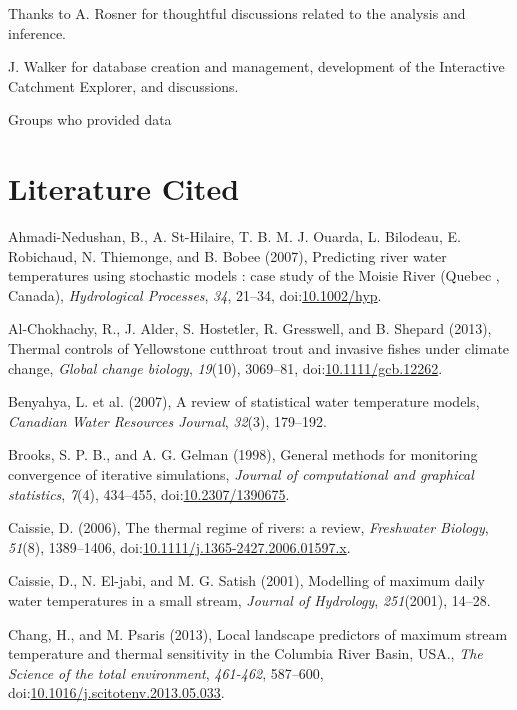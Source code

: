 Thanks to A. Rosner for thoughtful discussions related to the analysis
and inference.

J. Walker for database creation and management, development of the
Interactive Catchment Explorer, and discussions.

Groups who provided data

\section*{Literature Cited}\label{literature-cited}

\hypertarget{refs}{}
\hypertarget{ref-Ahmadi-Nedushan2007}{}
Ahmadi-Nedushan, B., A. St-Hilaire, T. B. M. J. Ouarda, L. Bilodeau, E.
Robichaud, N. Thiemonge, and B. Bobee (2007), Predicting river water
temperatures using stochastic models : case study of the Moisie River
(Quebec , Canada), \emph{Hydrological Processes}, \emph{34}, 21--34,
doi:\href{https://doi.org/10.1002/hyp}{10.1002/hyp}.

\hypertarget{ref-Al-Chokhachy2013a}{}
Al-Chokhachy, R., J. Alder, S. Hostetler, R. Gresswell, and B. Shepard
(2013), Thermal controls of Yellowstone cutthroat trout and invasive
fishes under climate change, \emph{Global change biology},
\emph{19}(10), 3069--81,
doi:\href{https://doi.org/10.1111/gcb.12262}{10.1111/gcb.12262}.

\hypertarget{ref-Benyahya2007}{}
Benyahya, L. et al. (2007), A review of statistical water temperature
models, \emph{Canadian Water Resources Journal}, \emph{32}(3), 179--192.

\hypertarget{ref-Brooks1998}{}
Brooks, S. P. B., and A. G. Gelman (1998), General methods for
monitoring convergence of iterative simulations, \emph{Journal of
computational and graphical statistics}, \emph{7}(4), 434--455,
doi:\href{https://doi.org/10.2307/1390675}{10.2307/1390675}.

\hypertarget{ref-Caissie2006}{}
Caissie, D. (2006), The thermal regime of rivers: a review,
\emph{Freshwater Biology}, \emph{51}(8), 1389--1406,
doi:\href{https://doi.org/10.1111/j.1365-2427.2006.01597.x}{10.1111/j.1365-2427.2006.01597.x}.

\hypertarget{ref-Caissie2001}{}
Caissie, D., N. El-jabi, and M. G. Satish (2001), Modelling of maximum
daily water temperatures in a small stream, \emph{Journal of Hydrology},
\emph{251}(2001), 14--28.

\hypertarget{ref-Chang2013}{}
Chang, H., and M. Psaris (2013), Local landscape predictors of maximum
stream temperature and thermal sensitivity in the Columbia River Basin,
USA., \emph{The Science of the total environment}, \emph{461-462},
587--600,
doi:\href{https://doi.org/10.1016/j.scitotenv.2013.05.033}{10.1016/j.scitotenv.2013.05.033}.

